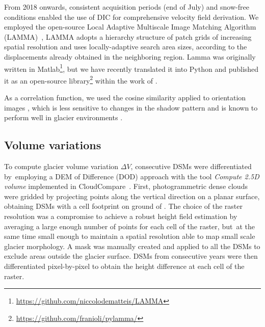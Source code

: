 From 2018 onwards, consistent acquisition periods (end of July) and snow-free conditions enabled the use of 
DIC for comprehensive velocity field derivation. 
We employed the open-source Local Adaptive Multiscale Image Matching Algorithm (LAMMA)~\citep{Dematteis2022}, 
LAMMA adopts a hierarchy structure of patch grids of increasing spatial resolution and
uses locally-adaptive search area sizes, according to the displacements already
obtained in the neighboring region.
Lamma was originally written in Matlab\footnote{\url{https://github.com/niccolodematteis/LAMMA}}, but we have 
recently translated it into Python and published it as an open-source library\footnote{\url{https://github.com/franioli/pylamma/}} 
within the work of \cite{ioli2024deep}.

As a correlation function, we used the cosine similarity applied to orientation images \citep{Dematteis2021}, 
which is less sensitive to changes in the shadow pattern and is known to perform well in glacier
environments \citep{Heid2012_evaluation_xcorr}.

\subsection{Volume variations}\label{sec:3:method_volumes}

To compute glacier volume variation $ \Delta V $, consecutive DSMs were differentiated
by~employing a DEM of Difference (DOD) approach with the tool \textit{Compute 2.5D volume}
implemented in CloudCompare~\citep{cloudcompare}.
First, photogrammetric dense clouds were gridded by projecting points along the vertical
direction on a planar surface, obtaining DSMs with a cell footprint on ground of .
The choice of the raster resolution was a compromise to achieve a robust height field
estimation by averaging a large enough number of points for each cell of the raster,
but~at the same time small enough to maintain a spatial resolution able to map small
scale glacier morphology.
A mask was manually created and applied to all the DSMs to exclude areas outside the
glacier surface.
DSMs from consecutive years were then differentiated pixel-by-pixel to obtain the height
difference at each cell of the raster.

